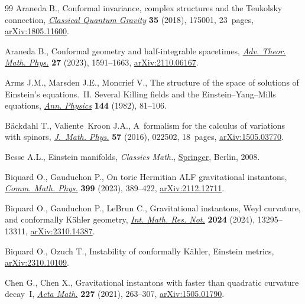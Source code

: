 \documentclass[pdftex]{sigma}
\numberwithin{equation}{section}
\begin{document}
\begin{thebibliography}{99}
Araneda B., Conformal invariance, complex structures and the {T}eukolsky
 connection, \href{https://doi.org/10.1088/1361-6382/aad13b}{\textit{Classical Quantum Gravity}} \textbf{35} (2018), 175001,
 23~pages, \href{https://arxiv.org/abs/1805.11600}{arXiv:1805.11600}.

Araneda B., Conformal geometry and half-integrable spacetimes, \href{https://doi.org/10.4310/atmp.2023.v27.n6.a1}{\textit{Adv.
 Theor. Math. Phys.}} \textbf{27} (2023), 1591--1663, \href{https://arxiv.org/abs/2110.06167}{arXiv:2110.06167}.

Arms J.M., Marsden J.E., Moncrief V., The structure of the space of solutions
 of {E}instein's equations.~{II}. {S}everal {K}illing fields and the
 {E}instein--{Y}ang--{M}ills equations, \href{https://doi.org/10.1016/0003-4916(82)90105-1}{\textit{Ann. Physics}} \textbf{144}
 (1982), 81--106.

B\"ackdahl T., Valiente~Kroon J.A., A~formalism for the calculus of variations
 with spinors, \href{https://doi.org/10.1063/1.4939562}{\textit{J.~Math. Phys.}} \textbf{57} (2016), 022502, 18~pages,
 \href{https://arxiv.org/abs/1505.03770}{arXiv:1505.03770}.

Besse A.L., Einstein manifolds, \textit{Classics Math.}, \href{https://doi.org/10.1007/978-3-540-74311-8}{Springer}, Berlin, 2008.

Biquard O., Gauduchon P., On toric {H}ermitian {ALF} gravitational instantons,
 \href{https://doi.org/10.1007/s00220-022-04562-z}{\textit{Comm. Math. Phys.}} \textbf{399} (2023), 389--422,
 \href{https://arxiv.org/abs/2112.12711}{arXiv:2112.12711}.

Biquard O., Gauduchon P., LeBrun C., Gravitational instantons, {W}eyl
 curvature, and conformally {K}\"ahler geometry, \href{https://doi.org/10.1093/imrn/rnae200}{\textit{Int. Math. Res. Not.}}
 \textbf{2024} (2024), 13295--13311, \href{https://arxiv.org/abs/2310.14387}{arXiv:2310.14387}.

Biquard O., Ozuch T., Instability of conformally {K}\"ahler, {E}instein
 metrics, \href{https://arxiv.org/abs/2310.10109}{arXiv:2310.10109}.

Chen G., Chen X., Gravitational instantons with faster than quadratic curvature
 decay~{I}, \href{https://doi.org/10.4310/acta.2021.v227.n2.a2}{\textit{Acta Math.}} \textbf{227} (2021), 263--307,
 \href{https://arxiv.org/abs/1505.01790}{arXiv:1505.01790}.


\end{thebibliography}
\end{document}
